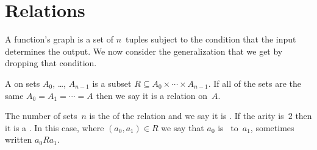 \documentclass{test}  %
\begin{document}
\begin{problem}

\end{problem}





\section{Relations}
A function's graph is a set of $n$~tuples
subject to the condition that the input determines the output.
We now consider the generalization that we get by dropping that condition.  

\begin{df}
A  on sets $A_0$, \ldots, $A_{n-1}$ is a subset
$R\subseteq A_0\times \cdots \times A_{n-1}$. 
If all of the sets are the same $A_0=A_1=\cdots =A$
then we say it is a relation on~$A$.

The number of sets~$n$ is the  of the relation
and we say it is .
If the arity is~$2$ then it is a .
In this case, where $(a_0,a_1)\in R$ we say 
that $a_0$ is~ to~$a_1$,
sometimes written $a_0Ra_1$.
\end{df}
\end{document}

